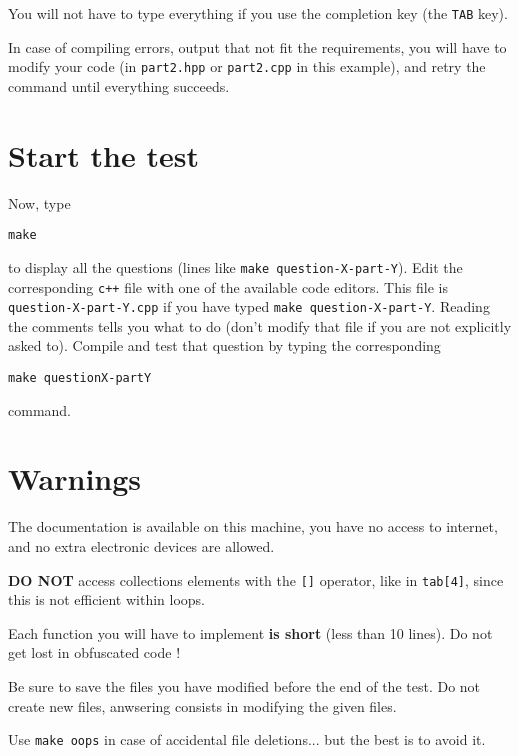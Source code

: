 \documentclass[a4paper,10pt]{article}
\begin{document}
You will not have to type everything if you use the completion key (the {\tt TAB} key).

In case of compiling errors, output that not fit the requirements, you will have to modify your code (in {\tt part2.hpp} or {\tt part2.cpp} in this example), and retry the command until everything succeeds. 

\section{Start the test \label{sec:starting}}

Now, type

\begin{verbatim}make
\end{verbatim}

to display all the questions (lines like {\tt make question-X-part-Y}). Edit the corresponding {\tt c++} file with one of the available code editors. This file is {\tt question-X-part-Y.cpp} if you have typed {\tt make question-X-part-Y}. Reading the comments tells you what to do (don't modify that file if you are not explicitly asked to). Compile and test that question by typing the corresponding 

\begin{verbatim}make questionX-partY
\end{verbatim}

command.

\section{Warnings}

The documentation is available on this machine, you have no access to internet, and no extra electronic devices are allowed.

{\bf DO NOT} access collections elements with the {\tt []} operator, like in {\tt  tab[4]}, since this is not efficient within loops.

Each function you will have to implement {\bf is short} (less than 10 lines). Do not get lost in obfuscated code !

Be sure to save the files you have modified before the end of the test. Do not create new files, anwsering consists in modifying the given files.

Use {\tt make oops} in case of accidental file deletions... but the best is to avoid it.
\end{document}
